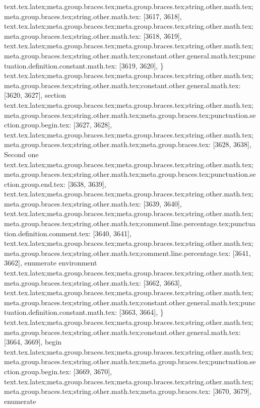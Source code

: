 {{{{{{{{{{{{{{{{{{{{{{{{{{{{{{{{{{{{{{{{{{{{{{{{{{{{{{{{{{{{{{{{{{{{{{{{{{{{{{{{{{{{{{{{{{{{{{{{{{{{{{{{{{{{{{{{text.tex.latex;meta.group.braces.tex;meta.group.braces.tex;string.other.math.tex;meta.group.braces.tex;string.other.math.tex: [3617, 3618], {
}
text.tex.latex;meta.group.braces.tex;meta.group.braces.tex;string.other.math.tex;meta.group.braces.tex;string.other.math.tex: [3618, 3619], {
}
text.tex.latex;meta.group.braces.tex;meta.group.braces.tex;string.other.math.tex;meta.group.braces.tex;string.other.math.tex;constant.other.general.math.tex;punctuation.definition.constant.math.tex: [3619, 3620], {\}
text.tex.latex;meta.group.braces.tex;meta.group.braces.tex;string.other.math.tex;meta.group.braces.tex;string.other.math.tex;constant.other.general.math.tex: [3620, 3627], {section}
text.tex.latex;meta.group.braces.tex;meta.group.braces.tex;string.other.math.tex;meta.group.braces.tex;string.other.math.tex;meta.group.braces.tex;punctuation.section.group.begin.tex: [3627, 3628], {{}
text.tex.latex;meta.group.braces.tex;meta.group.braces.tex;string.other.math.tex;meta.group.braces.tex;string.other.math.tex;meta.group.braces.tex: [3628, 3638], {Second one}
text.tex.latex;meta.group.braces.tex;meta.group.braces.tex;string.other.math.tex;meta.group.braces.tex;string.other.math.tex;meta.group.braces.tex;punctuation.section.group.end.tex: [3638, 3639], {}}
text.tex.latex;meta.group.braces.tex;meta.group.braces.tex;string.other.math.tex;meta.group.braces.tex;string.other.math.tex: [3639, 3640], {
}
text.tex.latex;meta.group.braces.tex;meta.group.braces.tex;string.other.math.tex;meta.group.braces.tex;string.other.math.tex;comment.line.percentage.tex;punctuation.definition.comment.tex: [3640, 3641], {%
text.tex.latex;meta.group.braces.tex;meta.group.braces.tex;string.other.math.tex;meta.group.braces.tex;string.other.math.tex;comment.line.percentage.tex: [3641, 3662], {enumerate environment}
text.tex.latex;meta.group.braces.tex;meta.group.braces.tex;string.other.math.tex;meta.group.braces.tex;string.other.math.tex: [3662, 3663], {
}
text.tex.latex;meta.group.braces.tex;meta.group.braces.tex;string.other.math.tex;meta.group.braces.tex;string.other.math.tex;constant.other.general.math.tex;punctuation.definition.constant.math.tex: [3663, 3664], {\}
text.tex.latex;meta.group.braces.tex;meta.group.braces.tex;string.other.math.tex;meta.group.braces.tex;string.other.math.tex;constant.other.general.math.tex: [3664, 3669], {begin}
text.tex.latex;meta.group.braces.tex;meta.group.braces.tex;string.other.math.tex;meta.group.braces.tex;string.other.math.tex;meta.group.braces.tex;punctuation.section.group.begin.tex: [3669, 3670], {{}
text.tex.latex;meta.group.braces.tex;meta.group.braces.tex;string.other.math.tex;meta.group.braces.tex;string.other.math.tex;meta.group.braces.tex: [3670, 3679], {enumerate}
}}}}}}}}}}}}}}}}}}}}}}}}}}}}}}}}}}}}}}}}}}}}}}}}}}}}}}}}}}}}}}}}}}}}}}}}}}}}}}}}}}}}}}}}}}}}}}}}}}}}}}}}}}}}}}}}}}}}
